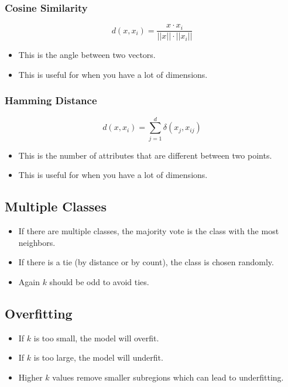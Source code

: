 \documentclass[12pt]{article}
\begin{document}
            \subsubsection{Cosine Similarity}
                \begin{equation}
                    d(x, x_i) = \frac{x \cdot x_i}{||x|| \cdot ||x_i||}
                \end{equation}
                \begin{itemize}
                    \item This is the angle between two vectors.
                    \item This is useful for when you have a lot of dimensions.
                \end{itemize}
            \subsubsection{Hamming Distance}
                \begin{equation}
                    d(x, x_i) = \sum_{j=1}^d \delta(x_j, x_{ij})
                \end{equation}
                \begin{itemize}
                    \item This is the number of attributes that are different between two points.
                    \item This is useful for when you have a lot of dimensions.
                \end{itemize}
        \subsection{Multiple Classes}
            \begin{itemize}
                \item If there are multiple classes, the majority vote is the class with the most neighbors.
                \item If there is a tie (by distance or by count), the class is chosen randomly.
                \item Again $k$ should be odd to avoid ties.
            \end{itemize}
        \subsection{Overfitting}
            \begin{itemize}
                \item If $k$ is too small, the model will overfit.
                \item If $k$ is too large, the model will underfit.
                \item Higher $k$ values remove smaller subregions which can lead to underfitting.
            \end{itemize}
\end{document}
